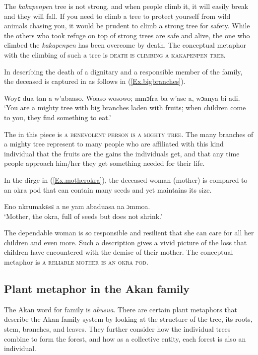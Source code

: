 \documentclass[output=paper,colorlinks,citecolor=brown]{langscibook}
\begin{document}
The \textit{kakapenpen} tree is not strong, and when people climb it, it will easily break and they will fall. If you need to climb a tree to protect yourself from wild animals chasing you, it would be prudent to climb a strong tree for safety. While the others who took refuge on top of strong trees are safe and alive, the one who climbed the \textit{kakapenpen} has been overcome by death. The conceptual metaphor with the climbing of such a tree is \textsc{death is climbing a kakapenpen tree}.

In describing the death of a dignitary and a responsible member of the family, the deceased is captured in \citet[35]{Nketia1955} as follows in (\ref{Ex.bigbranches}). 

\ea \label{Ex.bigbranches}
\gl Woyɛ dua tan a w’abaaso. Woaso wosowo; mmɔfra ba w’ase a, wɔanya bi adi.\\
\glt  ‘You are a mighty tree with big branches laden with fruits; when children come to you, they find something to eat.'
\z

The  in this piece is \textsc{a benevolent person is a mighty tree}. The many branches of a mighty tree represent to many people who are affiliated with this kind individual that the fruits are the gains the individuals get, and that any time people approach him/her they get something needed for their life. 
 	
In the dirge in (\ref{Ex.motherokra}), the deceased woman (mother) is compared to an okra pod that can contain many seeds and yet maintains its size.

\ea \label{Ex.motherokra}
\gl Eno nkrumakɛsɛ a ne yam abaduasa na ɔmmoa.\\
\glt  ‘Mother, the okra, full of seeds but does not shrink.'
\z

The dependable woman is so responsible and resilient that she can care for all her children and even more. Such a description gives a vivid picture of the loss that children have encountered with the demise of their mother. The conceptual metaphor is \textsc{a reliable mother is an okra pod}. 

\subsection{Plant metaphor in the Akan family}

The Akan word for family is \textit{abusua}. There are certain plant metaphors that describe the Akan family system by looking at the structure of the tree, its roots, stem, branches, and leaves. They further consider how the individual trees combine to form the forest, and how as a collective entity, each forest is also an individual. 
\end{document}
